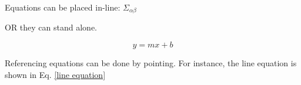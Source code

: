 \documentclass[12pt, letterpaper, oneside, onecolumn]{article}
\begin{document}







Equations can be placed in-line: $\Sigma_{\alpha\beta}$

OR they can stand alone. 

\begin{equation} \label{line equation}
	y = mx + b
\end{equation}

Referencing equations can be done by pointing. For instance, the line equation is shown in Eq. \ref{line equation}
\end{document}
